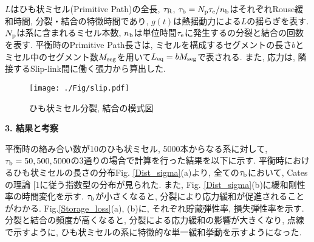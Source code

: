 \documentclass[twocolumns,10pt,a4j]{jarticle}
\makeatletter
\DeclareRobustCommand\cite{\unskip
  \@ifnextchar[{\@tempswatrue\@citex}{\@tempswafalse\@citex[]}}
\makeatother
\begin{document}


      \noindent
      $L$はひも状ミセル(Primitive Path)の全長, $\tau_{\rm R}$, $\tau_{\rm b}=N_{\rm p}\tau_{\rm e}/n_{\rm b}$はそれぞれRouse緩和時間, 分裂・結合の特徴時間であり, $g\left(t\right)$は熱揺動力による$L$の揺らぎを表す. $N_{\rm p}$は系に含まれるミセル本数, $n_{\rm b}$は単位時間$\tau_{\rm e}$に発生するの分裂と結合の回数を表す. 平衡時のPrimitive Path長さは, ミセルを構成するセグメントの長さ$b$とミセル中のセグメント数$M_{\rm seg}$を用いて$L_{\rm eq}=bM_{\rm seg}$で表される. また, 応力は, 隣接するSlip-link間に働く張力から算出した. \
      
      \vspace{-4.0truemm}
      \begin{figure}[H]
	\hspace{4truemm}
	  \centering \texttt{[image: ./Fig/slip.pdf]}\vspace{-5truemm}
	\caption{ひも状ミセル分裂, 結合の模式図}
        \label{Slip-link}
      \end{figure}
      \vspace{-4truemm}

      \noindent
      {\bf \large 3. 結果と考察}
      \par
      平衡時の絡み合い数が10のひも状ミセル, 5000本からなる系に対して, $\tau_{\rm b}=50, 500, 5000$の3通りの場合で計算を行った結果を以下に示す. 平衡時におけるひも状ミセルの長さの分布Fig. \ref{Dist_sigma}(a)より, 全ての$\tau_{\rm b}$において, Catesの理論\cite{1}に従う指数型の分布が見られた. また, Fig. \ref{Dist_sigma}(b)に緩和剛性率の時間変化を示す. $\tau_{\rm b}$が小さくなると, 分裂により応力緩和が促進されることがわかる. Fig.\ref{Storage_loss}(a), (b)に, それぞれ貯蔵弾性率, 損失弾性率を示す. 分裂と結合の頻度が高くなると, 分裂による応力緩和の影響が大きくなり, 点線で示すように, ひも状ミセルの系に特徴的な単一緩和挙動を示すようになった. 
\end{document}
